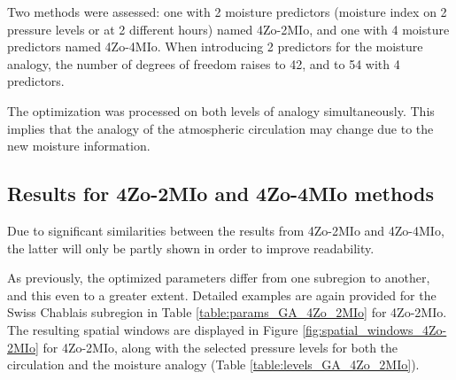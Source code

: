 \documentclass[review]{elsarticle}
\begin{document}
Two methods were assessed: one with 2 moisture predictors (moisture index on 2 pressure levels or at 2 different hours) named 4Zo-2MIo, and one with 4 moisture predictors named 4Zo-4MIo. When introducing 2 predictors for the moisture analogy, the number of degrees of freedom raises to 42, and to 54 with 4 predictors.

The optimization was processed on both levels of analogy simultaneously. This implies that the analogy of the atmospheric circulation may change due to the new moisture information.


\subsection{Results for 4Zo-2MIo and 4Zo-4MIo methods}

Due to significant similarities between the results from 4Zo-2MIo and 4Zo-4MIo, the latter will only be partly shown in order to improve readability.

As previously, the optimized parameters differ from one subregion to another, and this even to a greater extent. Detailed examples are again provided for the Swiss Chablais subregion in Table \ref{table:params_GA_4Zo_2MIo} for 4Zo-2MIo. The resulting spatial windows are displayed in Figure \ref{fig:spatial_windows_4Zo-2MIo} for 4Zo-2MIo, along with the selected pressure levels for both the circulation and the moisture analogy (Table \ref{table:levels_GA_4Zo_2MIo}). 
\end{document}
